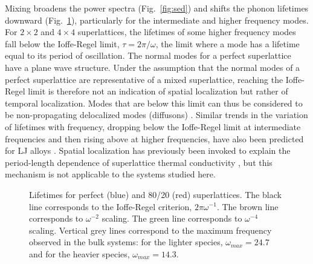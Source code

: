 Mixing broadens the power spectra (Fig.~\ref{fig:sed}) and shifts the phonon lifetimes downward (Fig.~\ref{FIG:lifetime}), particularly for the intermediate and higher frequency modes. For $2 \times 2$ and $ 4 \times 4$ superlattices,  the lifetimes of some higher frequency modes fall below the Ioffe-Regel limit, $\tau =2\pi/\omega$, the limit where a mode has a lifetime equal to its period of oscillation. The normal modes for a perfect superlattice have a plane wave structure. Under the assumption that the normal modes of a perfect superlattice are representative of a mixed superlattice, reaching the Ioffe-Regel limit is therefore not an indication of spatial localization but rather of temporal localization. Modes that are below this limit can thus be considered to be non-propagating delocalized modes (diffusons) \cite{allen_thermal_1993,allen1999diffusons}. Similar trends in the variation of lifetimes with frequency, dropping below the Ioffe-Regel limit at intermediate frequencies and then rising above at higher frequencies, have also been predicted for LJ alloys \cite{jason2013vc}. Spatial localization has previously been invoked to explain the period-length dependence of superlattice thermal conductivity \cite{PhysRevB.61.3091}, but this mechanism is not applicable to the systems studied here.

\renewcommand{\textfraction}{0.0}
\begin{figure}%
\begin{center}
\renewcommand{\figure}{Fig.}
\caption{Lifetimes for perfect (blue) and 80/20 (red) superlattices. The black line corresponds to the Ioffe-Regel criterion, $2\pi\omega^{-1}$. The brown line corresponds to $\omega^{-2}$ scaling. The green line corresponds to $\omega^{-4}$ scaling. Vertical grey lines correspond to the maximum frequency observed in the bulk systems: for the lighter species, $\omega_{max}=24.7$ and for the heavier species, $\omega_{max}=14.3$. } 
\label{FIG:lifetime}
\end{center}
\end{figure}

